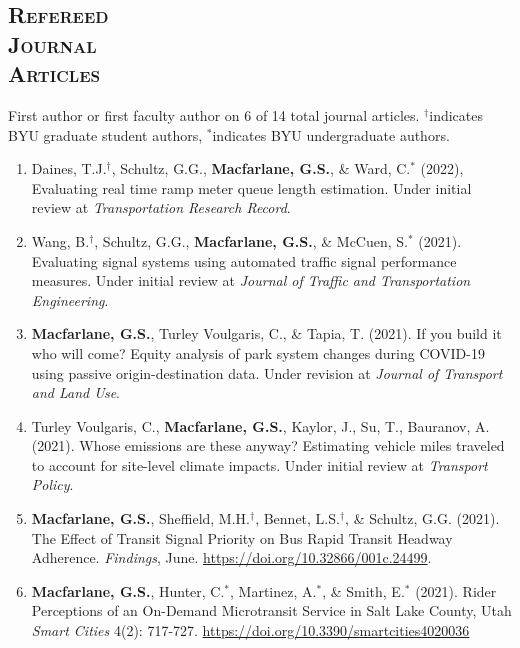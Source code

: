 \documentclass[margin,line]{res}
\newif\ifdetail
\newcounter{enuminitialize}
\newenvironment{myenum}[1][]
{%
 \setcounter{enuminitialize}{#1}
 \addtocounter{enuminitialize}{2}
 \begin{enumerate}[left= 4pt, itemsep=12pt, start=\value{enuminitialize}, label=\arabic*\addtocounter{enumi}{-2}]
}
{%
 \end{enumerate}
}
\newcommand{\secfont}{\scshape }
\begin{document}
\begin{resume}
\section{\secfont Refereed \\ Journal\\ Articles}
First author or first faculty author on 6 of 14 total journal articles.
$^\dagger$indicates BYU graduate student authors, $^*$indicates BYU undergraduate authors.
\ifdetail Paper 1 came from my undergraduate work, papers 2 through 6 were from my doctoral research, and
papers 7 through 14 represent work completed during my time on the faculty at BYU. Number of citations
are from Google Scholar as of December 2021. \fi
\vspace{.3cm}

\begin{myenum}[14]

  \item Daines, T.J.$^\dagger$, Schultz, G.G., \textbf{Macfarlane, G.S.}, \& Ward, C.$^*$ (2022), Evaluating real time ramp meter queue length estimation. Under initial review at \textit{Transportation Research Record}.

  \item Wang, B.$^\dagger$, Schultz, G.G., \textbf{Macfarlane, G.S.}, \& McCuen, S.$^*$ (2021). Evaluating signal systems using automated traffic signal performance measures. Under initial review at \textit{Journal of Traffic and Transportation Engineering}.

  \item \textbf{Macfarlane, G.S.}, Turley Voulgaris, C., \& Tapia, T. (2021). If you build it who will come? Equity analysis of park system changes during COVID-19 using passive origin-destination data. Under revision at \textit{Journal of Transport and Land Use}.

  \item Turley Voulgaris, C., \textbf{Macfarlane, G.S.}, Kaylor, J., Su, T., Bauranov, A. (2021). Whose emissions are these anyway? Estimating vehicle miles traveled to account for site-level climate impacts. Under initial review at \textit{Transport Policy}.

  \item \textbf{Macfarlane, G.S.}, Sheffield, M.H.$^\dagger$, Bennet, L.S.$^\dagger$, \& Schultz, G.G. (2021).
  The Effect of Transit Signal Priority on Bus Rapid Transit Headway Adherence. \textit{Findings}, June. \url{https://doi.org/10.32866/001c.24499}.

  \item\textbf{Macfarlane, G.S.}, Hunter, C.$^*$, Martinez, A.$^*$, \& Smith, E.$^*$  (2021). Rider
Perceptions of an On-Demand Microtransit Service in Salt Lake County, Utah
\textit{ Smart Cities} 4(2): 717-727. \url{https://doi.org/10.3390/smartcities4020036} \ifdetail Citations: 1 \fi


\end{myenum}
\end{resume}
\end{document}

